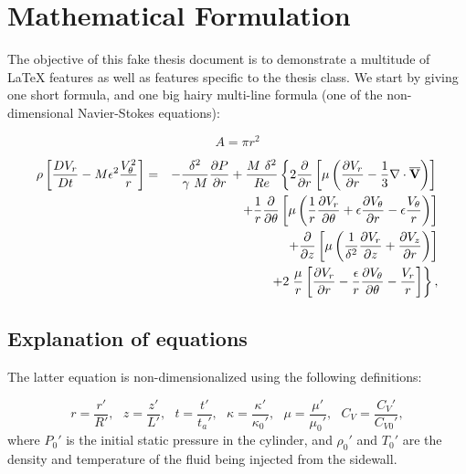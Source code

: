 \chapter{Mathematical Formulation}
\label{mathchapter}

The objective of this fake thesis document is to demonstrate
a multitude of \LaTeX{} features as well as features specific
to the thesis class.
We start by giving one short formula,
and one big hairy multi-line formula
(one of the non-dimensional Navier-Stokes equations):

\begin{equation}
	A = \pi r^2
\end{equation}


\begin{eqnarray}
  \rho \left[ \frac{DV_r}{Dt} - M \epsilon^2
    \frac{V_{\theta}^2}{r} \right]
  & = & -\frac{\delta^2}{\gamma~ M} \frac{\partial P}{\partial r}
	+ \frac{M ~\delta^2}{Re} \left\{ 2 \frac{\partial }{\partial r}
	\left[ \mu \left( \frac{\partial V_r}{\partial r}
        - \frac{1}{3} {\bf \nabla \cdot \overline{V}}
      \right) \right] \right. \nonumber \\
  & & + \frac{1}{r} \frac{\partial }{\partial \theta} \left[ \mu \left(
      \frac{1}{r} \frac{\partial V_r}{\partial \theta} + \epsilon \frac{\partial V_{\theta}}{\partial r}
      - \epsilon \frac{V_{\theta}}{r} \right) \right] \nonumber \\
  & & + \frac{\partial }{\partial z} \left[ \mu \left( \frac{1}{\delta^2}
        \frac{\partial V_r}{\partial z} + \frac{\partial V_z}{\partial r} \right) \right] \nonumber \\
  & & + 2 \left. \frac{\mu}{r}\left[ \frac{\partial V_r}{\partial r} -\frac{\epsilon}{r}
      \frac{\partial V_{\theta}}{\partial \theta} - \frac{V_r}r\right] \right\}, \label{eq:rmom}
\end{eqnarray}


\section{Explanation of equations}

The latter equation is non-dimensionalized using the following definitions:

\[
	r = \frac{r'}{R'}, ~~~
	z = \frac{z'}{L'},~~~
	t = \frac{t'}{t_a'}, ~~~
	\kappa = \frac{\kappa'}{\kappa_0'}, ~~~
	\mu = \frac{\mu'}{\mu_0'} , ~~~
	C_V = \frac{C_V'}{C_{V0}'},
\]
where $P_0'$ is the initial static pressure in the cylinder,
and $\rho_0'$ and $T_0'$ are the density and temperature
of the fluid being injected from the sidewall.

